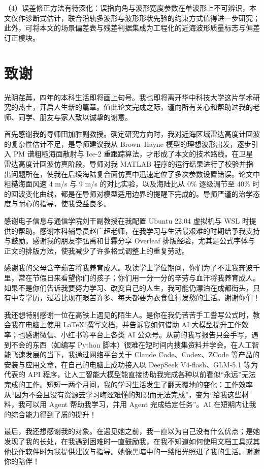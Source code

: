 \documentclass[a4paper]{article}
\newcommand{\song}{\CJKfamily{song}}
\newcommand{\xiaosihao}{\fontsize{12pt}{18pt}\selectfont}
\newcommand{\sectionbreak}{\clearpage} %
\newcommand\seccontent{
	\song
	\xiaosihao
    \setlength{\parindent}{2em}
    \setlength{\parskip}{0pt}
    }
\newenvironment{thankpage}{
	\clearpage%
	\phantomsection%
	\addcontentsline{toc}{section}{致谢}%
	\section*{致\hspace{2em}谢}%
}{
	\clearpage
}
\begin{document}
（4）误差修正方法有待深化：误指向角与波形宽度参数在单波形上不可辨识，本文仅作诊断式估计，联合沿轨多波形与波形形状先验的约束方式值得进一步研究；此外，可将本文的场景偏差表与残差判据集成为工程化的近海波形质量标志与偏差订正模块。

\sectionbreak

\begin{thankpage}
	\seccontent
	光阴荏苒，四年的本科生活即将画上句号。我也即将离开华中科技大学这片学术研究的热土，开启人生新的篇章。值此论文完成之际，谨向所有关心和帮助过我的老师、同学、朋友与家人致以诚挚的谢意。

	首先感谢我的导师田加胜副教授。确定研究方向时，我对近海区域雷达高度计回波的复杂性估计不足，是导师建议我从 Brown--Hayne 模型的理想波形出发，逐步引入 PM 谱粗糙海面散射与 Ice-2 重跟踪算法，才形成了本文的技术路线。在卫星雷达高度计回波仿真阶段，导师对我 MATLAB 程序的运行结果进行了校验并指出问题所在，使我在后续海陆复合面仿真中迅速定位了多次参数设置错误。论文中粗糙海面风速 4 m/s 与 9 m/s 的对比实验，以及海陆比从 0\% 逐级调节至 40\% 时的回波变化曲线，都是在导师对模型适用边界的提醒下完成的。导师严谨的治学态度与耐心的指导，使我受益良多。

	感谢电子信息与通信学院刘干副教授在我配置 Ubuntu 22.04 虚拟机与 WSL 时提供的帮助。感谢本科辅导员赵广超老师，在我学习与生活最艰难的时期给予我支持与鼓励。感谢我的朋友李弘禹和甘霖分享 Overleaf 排版经验，尤其是公式字体与正文的排版方法，使我减少了许多格式调整上的重复劳动。

	感谢我的父母含辛茹苦将我养育成人。攻读学士学位期间，你们为了不让我奔波千里，常在节假日来看望你们的孩子；你们用一分一分的辛劳与血汗将我养育成人。如果不是你们告诉我要努力学习、改变自己的人生，我可能仍漂泊在成都街头，只有中专学历，过着比现在艰苦许多、每天都要为衣食住行发愁的生活。谢谢你们！

	我还想特别感谢一位在高铁上遇见的陌生人。是你在我仍苦苦手工誊写公式时，教会我在电脑上使用 \LaTeX{} 撰写文档，并告诉我如何借助 AI 大模型提升工作效率；也感谢微信、小红书等平台上各类 AI 公众号。从前的我写报告只会手写，遇到不会的东西（如编写 Python 脚本）很难在短时间内搜集资料并学会。在人工智能飞速发展的当下，我通过网络平台关于 Claude Code、Codex、ZCode 等产品的安装与应用文章，在自己的电脑上成功接入以 DeepSeek V4-flash、GLM-5.1 等为代表的 API 程序，让人工智能大模型能直接协助我完成各种以前看似“永远”无法完成的工作。短短一两个月间，我的学习生活发生了翻天覆地的变化：工作效率从“因为不会且没有资源去学习晦涩难懂的知识而无法完成”，变为“给我这些材料，我可以用 Agent 帮助我学习，并用 Agent 完成给定任务”。AI 在短期内让我的综合能力得到了质的提升！

	最后，我还想感谢我的对象。在遇见她之前，我一直以为自己没有什么优点；是她发现了我的长处，在我遇到困难时一直鼓励我，在我不知道如何使用文档工具或其他操作软件时为我提供建议与指导。她像黑暗中的一缕阳光照进了我的生活。谢谢你的陪伴！
\end{thankpage}
\end{document}
